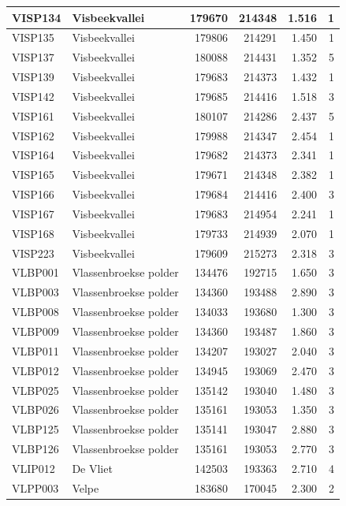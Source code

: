 \documentclass[11pt,]{book}
\begin{document}
\begin{table}
\begin{tabular}[t]{l|l|r|r|r|r}
\hline
VISP134 & Visbeekvallei & 179670 & 214348 & 1.516 & 1\\
\hline
VISP135 & Visbeekvallei & 179806 & 214291 & 1.450 & 1\\
\hline
VISP137 & Visbeekvallei & 180088 & 214431 & 1.352 & 5\\
\hline
VISP139 & Visbeekvallei & 179683 & 214373 & 1.432 & 1\\
\hline
VISP142 & Visbeekvallei & 179685 & 214416 & 1.518 & 3\\
\hline
VISP161 & Visbeekvallei & 180107 & 214286 & 2.437 & 5\\
\hline
VISP162 & Visbeekvallei & 179988 & 214347 & 2.454 & 1\\
\hline
VISP164 & Visbeekvallei & 179682 & 214373 & 2.341 & 1\\
\hline
VISP165 & Visbeekvallei & 179671 & 214348 & 2.382 & 1\\
\hline
VISP166 & Visbeekvallei & 179684 & 214416 & 2.400 & 3\\
\hline
VISP167 & Visbeekvallei & 179683 & 214954 & 2.241 & 1\\
\hline
VISP168 & Visbeekvallei & 179733 & 214939 & 2.070 & 1\\
\hline
VISP223 & Visbeekvallei & 179609 & 215273 & 2.318 & 3\\
\hline
VLBP001 & Vlassenbroekse polder & 134476 & 192715 & 1.650 & 3\\
\hline
VLBP003 & Vlassenbroekse polder & 134360 & 193488 & 2.890 & 3\\
\hline
VLBP008 & Vlassenbroekse polder & 134033 & 193680 & 1.300 & 3\\
\hline
VLBP009 & Vlassenbroekse polder & 134360 & 193487 & 1.860 & 3\\
\hline
VLBP011 & Vlassenbroekse polder & 134207 & 193027 & 2.040 & 3\\
\hline
VLBP012 & Vlassenbroekse polder & 134945 & 193069 & 2.470 & 3\\
\hline
VLBP025 & Vlassenbroekse polder & 135142 & 193040 & 1.480 & 3\\
\hline
VLBP026 & Vlassenbroekse polder & 135161 & 193053 & 1.350 & 3\\
\hline
VLBP125 & Vlassenbroekse polder & 135141 & 193047 & 2.880 & 3\\
\hline
VLBP126 & Vlassenbroekse polder & 135161 & 193053 & 2.770 & 3\\
\hline
VLIP012 & De Vliet & 142503 & 193363 & 2.710 & 4\\
\hline
VLPP003 & Velpe & 183680 & 170045 & 2.300 & 2\\

\end{tabular}
\end{table}
\end{document}
